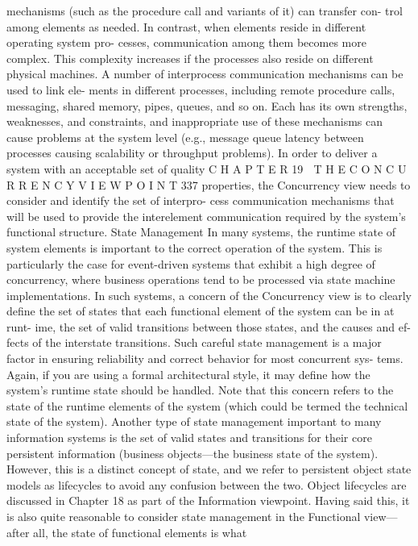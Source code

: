 mechanisms (such as the procedure call and variants of it) can transfer con-
trol among elements as needed.
In contrast, when elements reside in different operating system pro-
cesses, communication among them becomes more complex. This complexity
increases if the processes also reside on different physical machines.
A number of interprocess communication mechanisms can be used to link ele-
ments in different processes, including remote procedure calls, messaging, shared
memory, pipes, queues, and so on. Each has its own strengths, weaknesses, and
constraints, and inappropriate use of these mechanisms can cause problems at the
system level (e.g., message queue latency between processes causing scalability or
throughput problems). In order to deliver a system with an acceptable set of quality
C H A P T E R 19  T H E C O N C U R R E N C Y V I E W P O I N T
 337
properties, the Concurrency view needs to consider and identify the set of interpro-
cess communication mechanisms that will be used to provide the interelement
communication required by the system’s functional structure.
State Management
In many systems, the runtime state of system elements is important to the
correct operation of the system. This is particularly the case for event-driven
systems that exhibit a high degree of concurrency, where business operations
tend to be processed via state machine implementations.
In such systems, a concern of the Concurrency view is to clearly define
the set of states that each functional element of the system can be in at runt-
ime, the set of valid transitions between those states, and the causes and ef-
fects of the interstate transitions. Such careful state management is a major
factor in ensuring reliability and correct behavior for most concurrent sys-
tems. Again, if you are using a formal architectural style, it may define how
the system’s runtime state should be handled.
Note that this concern refers to the state of the runtime elements of the
system (which could be termed the technical state of the system). Another
type of state management important to many information systems is the set
of valid states and transitions for their core persistent information (business
objects—the business state of the system). However, this is a distinct concept
of state, and we refer to persistent object state models as lifecycles to avoid
any confusion between the two. Object lifecycles are discussed in Chapter 18
as part of the Information viewpoint.
Having said this, it is also quite reasonable to consider state management
in the Functional view—after all, the state of functional elements is what
